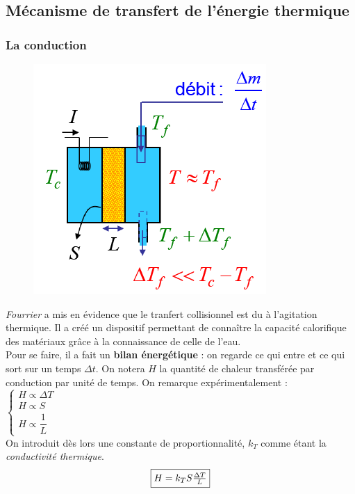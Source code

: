\documentclass	[11pt, a4paper, openany]{book}
\begin{document}
\subsection{Mécanisme de transfert de l'énergie thermique}
\subsubsection{La conduction}
\begin{figure}
	\includegraphics[scale=0.4]{th/image8.png}
\end{figure}
\textit{Fourrier} a mis en évidence que le tranfert collisionnel est du à l'agitation thermique. Il a créé un dispositif permettant de connaître la capacité calorifique des matériaux grâce à la connaissance de celle de l'eau.\\

Pour se faire, il a fait un \textbf{bilan énergétique} : on regarde ce qui entre et ce qui sort sur un temps $\Delta t$. On notera $H$ la quantité de chaleur transférée par conduction par unité de temps. On remarque expérimentalement :\\
$\left\{\begin{array}{l}
H \propto \Delta T\\
H \propto S\\
H \propto \dfrac{1}{L}
\end{array}\right.$\\
On introduit dès lors une constante de proportionnalité, $k_T$ comme étant la \textit{conductivité thermique}.
\begin{equation}
	\fbox{$ H = k_TS\frac{\Delta T}{L}$}
\end{equation}
\end{document}
